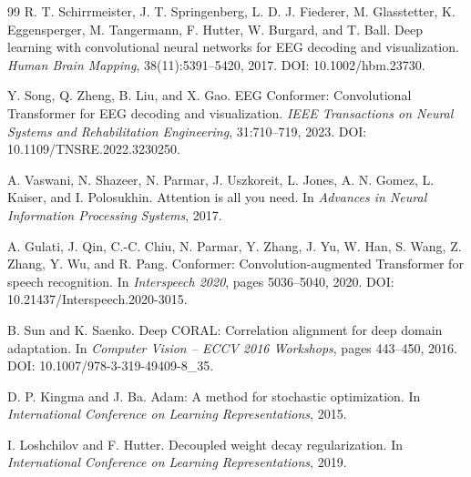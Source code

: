 \documentclass[UTF8,a4paper,10pt,fontset=windows]{ctexart}
\begin{document}
\begin{thebibliography}{99}
R. T. Schirrmeister, J. T. Springenberg, L. D. J. Fiederer, M. Glasstetter, K. Eggensperger, M. Tangermann, F. Hutter, W. Burgard, and T. Ball.
Deep learning with convolutional neural networks for EEG decoding and visualization.
\textit{Human Brain Mapping}, 38(11):5391--5420, 2017. DOI: 10.1002/hbm.23730.

Y. Song, Q. Zheng, B. Liu, and X. Gao.
EEG Conformer: Convolutional Transformer for EEG decoding and visualization.
\textit{IEEE Transactions on Neural Systems and Rehabilitation Engineering}, 31:710--719, 2023. DOI: 10.1109/TNSRE.2022.3230250.

A. Vaswani, N. Shazeer, N. Parmar, J. Uszkoreit, L. Jones, A. N. Gomez, L. Kaiser, and I. Polosukhin.
Attention is all you need.
In \textit{Advances in Neural Information Processing Systems}, 2017.

A. Gulati, J. Qin, C.-C. Chiu, N. Parmar, Y. Zhang, J. Yu, W. Han, S. Wang, Z. Zhang, Y. Wu, and R. Pang.
Conformer: Convolution-augmented Transformer for speech recognition.
In \textit{Interspeech 2020}, pages 5036--5040, 2020. DOI: 10.21437/Interspeech.2020-3015.

B. Sun and K. Saenko.
Deep CORAL: Correlation alignment for deep domain adaptation.
In \textit{Computer Vision -- ECCV 2016 Workshops}, pages 443--450, 2016. DOI: 10.1007/978-3-319-49409-8\_35.

D. P. Kingma and J. Ba.
Adam: A method for stochastic optimization.
In \textit{International Conference on Learning Representations}, 2015.

I. Loshchilov and F. Hutter.
Decoupled weight decay regularization.
In \textit{International Conference on Learning Representations}, 2019.

\end{thebibliography}
\end{document}
